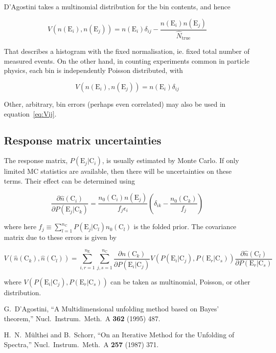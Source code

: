\documentclass[12pt,a4paper]{article}
\newcommand{\E}{\mathrm{E}}
\newcommand{\C}{\mathrm{C}}
\newcommand{\dd}[2]{\frac{\partial{#1}}{\partial{#2}}}
\begin{document}
D'Agostini takes a multinomial distribution for the bin contents, and hence

\begin{equation}
V(n(\E_i),n(\E_j)) = n(\E_i) \delta_{ij} - \frac{n(\E_i) n(\E_j)}{\hat{N}_{\mathrm{true}}}
\end{equation}

That describes a histogram with the fixed normalisation, ie. fixed total number of measured events.
On the other hand, in counting experiments common in particle physics, each bin is independently Poisson distributed, with

\begin{equation}
V(n(\E_i),n(\E_j)) = n(\E_i) \delta_{ij}
\end{equation}

Other, arbitrary, bin errors (perhaps even correlated) may also be used in equation~\ref{eq:Vij}.

\subsection{Response matrix uncertainties}

The response matrix, $P(\E_j|\C_i)$, is usually estimated by Monte Carlo. If only limited MC statistics
are available, then there will be uncertainties on these terms. Their effect can be determined using

\begin{equation}
\dd{\hat{n}(\C_i)}{P(\E_j|\C_k)} = \frac{n_0(\C_i) n(\E_j)}{f_j \epsilon_i} \left( \delta_{ik} - \frac{n_0(\C_k)}{f_j} \right)
\end{equation}

where here $f_j \equiv \sum_{l=1}^{n_{\C}} P(\E_j|\C_l) n_0(\C_l)$ is the folded prior. The covariance matrix due to these errors is
given by

\begin{equation}
V(\hat{n}(\C_k),\hat{n}(\C_l)) = \sum_{i,r=1}^{n_{\E}} \sum_{j,s=1}^{n_{\C}} \dd{\hat{n}(\C_k)}{P(\E_i|\C_j)} V(P(\E_i|\C_j),P(\E_r|\C_s)) \dd{\hat{n}(\C_l)}{P(\E_r|\C_s)}
\end{equation}

where $V(P(\E_i|\C_j),P(\E_r|\C_s))$ can be taken as multinomial, Poisson, or other distribution.

\begin{thebibliography}{99}

  G.~D'Agostini,
  ``A Multidimensional unfolding method based on Bayes' theorem,''
  Nucl.\ Instrum.\ Meth.\  A {\bf 362} (1995) 487.

  H.~N.~M\"ulthei and B.~Schorr,
  ``On an Iterative Method for the Unfolding of Spectra,''
  Nucl.\ Instrum.\ Meth.\  A {\bf 257} (1987) 371.

\end{thebibliography}
\end{document}
